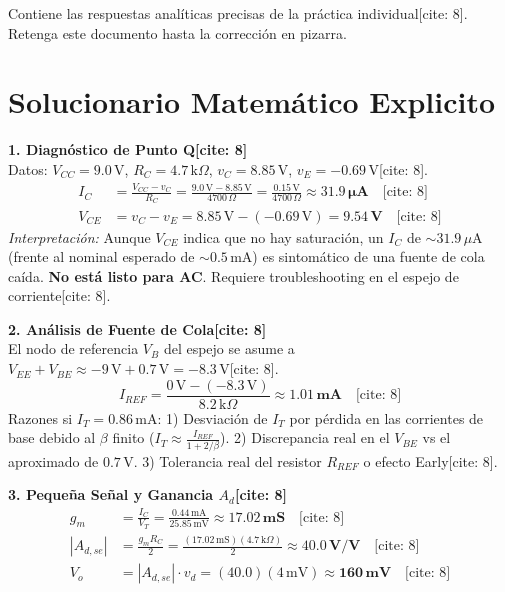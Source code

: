 \documentclass[11pt, a4paper]{article}
\begin{document}
\begin{tcolorbox}[colback=red!5, colframe=red!70!black, title=\textbf{Material Reservado Docente: Solucionario y Blueprint de Examen}]
    Contiene las respuestas analíticas precisas de la práctica individual[cite: 8]. Retenga este documento hasta la corrección en pizarra.
\end{tcolorbox}

\section*{Solucionario Matemático Explicito}

\textbf{1. Diagnóstico de Punto Q[cite: 8]} \\
Datos: $V_{CC}=9.0\,\text{V}$, $R_C=4.7\,\text{k}\Omega$, $v_C=8.85\,\text{V}$, $v_E=-0.69\,\text{V}$[cite: 8].
\begin{align*}
    I_C &= \frac{V_{CC} - v_C}{R_C} = \frac{9.0\,\text{V} - 8.85\,\text{V}}{4700\,\Omega} = \frac{0.15\,\text{V}}{4700\,\Omega} \approx \mathbf{31.9\,\mu\text{A}} \quad \text{[cite: 8]} \\
    V_{CE} &= v_C - v_E = 8.85\,\text{V} - (-0.69\,\text{V}) = \mathbf{9.54\,\text{V}} \quad \text{[cite: 8]}
\end{align*}
\textit{Interpretación:} Aunque $V_{CE}$ indica que no hay saturación, un $I_C$ de $\sim 31.9\,\mu\text{A}$ (frente al nominal esperado de $\sim 0.5\,\text{mA}$) es sintomático de una fuente de cola caída. \textbf{No está listo para AC}. Requiere troubleshooting en el espejo de corriente[cite: 8].

\vspace{0.3cm}
\textbf{2. Análisis de Fuente de Cola[cite: 8]} \\
El nodo de referencia $V_B$ del espejo se asume a $V_{EE} + V_{BE} \approx -9\,\text{V} + 0.7\,\text{V} = -8.3\,\text{V}$[cite: 8].
\begin{equation*}
    I_{REF} = \frac{0\,\text{V} - (-8.3\,\text{V})}{8.2\,\text{k}\Omega} \approx \mathbf{1.01\,\text{mA}} \quad \text{[cite: 8]}
\end{equation*}
Razones si $I_T = 0.86\,\text{mA}$:
1) Desviación de $I_T$ por pérdida en las corrientes de base debido al $\beta$ finito ($I_T \approx \frac{I_{REF}}{1+2/\beta}$).
2) Discrepancia real en el $V_{BE}$ vs el aproximado de $0.7\,\text{V}$.
3) Tolerancia real del resistor $R_{REF}$ o efecto Early[cite: 8].

\vspace{0.3cm}
\textbf{3. Pequeña Señal y Ganancia $A_d$[cite: 8]}
\begin{align*}
    g_m &= \frac{I_C}{V_T} = \frac{0.44\,\text{mA}}{25.85\,\text{mV}} \approx \mathbf{17.02\,\text{mS}} \quad \text{[cite: 8]} \\
    |A_{d,se}| &= \frac{g_m R_C}{2} = \frac{(17.02\,\text{mS})(4.7\,\text{k}\Omega)}{2} \approx \mathbf{40.0\,\text{V/V}} \quad \text{[cite: 8]} \\
    V_o &= |A_{d,se}| \cdot v_d = (40.0)(4\,\text{mV}) \approx \mathbf{160\,\text{mV}} \quad \text{[cite: 8]}
\end{align*}
\end{document}
